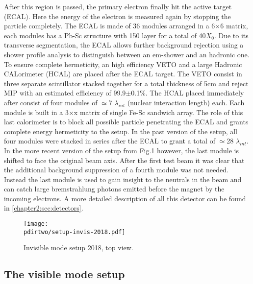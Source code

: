 After this region is passed, the primary electron finally hit the active target (ECAL). Here the energy of the electron is measured again by stopping the particle completely. The ECAL is made of 36 modules arranged in a 6$\times$6 matrix, each modules has a Pb-Sc structure with 150 layer for a total of 40$X_0$. Due to its transverse segmentation, the ECAL allows further background rejection using a shower profile analysis to distinguish between an em-shower and an hadronic one. To ensure complete hermeticity, an high efficiency VETO and a large Hadronic CALorimeter (HCAL) are placed after the ECAL target. The VETO consist in three separate scintillator stacked together for a total thickness of 5\si{cm} and reject MIP with an estimated efficiency of 99.9$\pm$0.1\%. The HCAL placed immediately after consist of four modules of $\simeq$7 $\lambda_{int}$ (nuclear interaction length) each. Each module is built in a 3$\times$x matrix of single Fe-Sc sandwich array. The role of this last calorimeter is to block all possible particle penetrating the ECAL and grants complete energy hermeticity to the setup. In the past version of the setup, all four modules were stacked in series after the ECAL to grant a total of $\simeq$28 $\lambda_{int}$. In the more recent version of the setup from Fig.\ref{fig:setup-invis-2018} however, the last module is shifted to face the original beam axis. After the first test beam it was clear that the additional background suppression of a fourth module was not needed. Instead the last module is used to gain insight to the neutrals in the beam and can catch large bremstrahlung photons emitted before the magnet by the incoming electrons. A more detailed description of all this detector can be found in \ref{chapter2:sec:detectors}.


\begin{figure}[tbh!]
  \centering
  \texttt{[image: \\pdirtwo/setup-invis-2018.pdf]}
  \caption[invisible mode setup 2018]{Invisible mode setup 2018, top view.}
  \label{fig:setup-invis-2018}
\end{figure}

\subsection{The visible mode setup}
\label{chapter2:sec:vismode}

